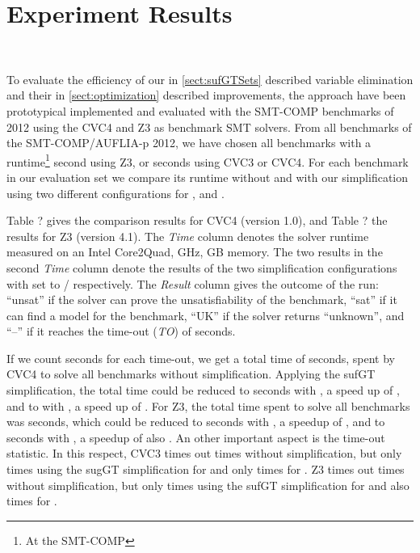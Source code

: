\section{Experiment Results}
\label{a:sect:experiments}

\\


To evaluate the efficiency of our in \ref{sect:sufGTSets} described variable elimination and their in \ref{sect:optimization} described improvements, the approach have been prototypical implemented and evaluated with the SMT-COMP benchmarks of 2012 using the CVC4 and Z3 as benchmark SMT solvers. 
From all benchmarks of the SMT-COMP/AUFLIA-p 2012, we have chosen all benchmarks with a runtime\footnote{At the SMT-COMP}  second using Z3, or  seconds using CVC3 or CVC4. 
For each benchmark in our evaluation set we compare its runtime without and with our simplification using two different configurations for ,  and  .

Table ?
gives the comparison results for CVC4 (version 1.0), and Table ?
the results for Z3 (version 4.1).
The \emph{Time} column denotes the solver runtime measured on an Intel Core2Quad, GHz, GB memory. The two results in the second \emph{Time} column denote the results of the two simplification configurations with  set to  /  respectively. The \emph{Result} column gives the outcome of the run: ``unsat'' if the solver can prove the unsatisfiability of the benchmark, ``sat'' if it can find a model for the benchmark, ``UK'' if the solver returns ``unknown'', and ``--'' if it reaches the time-out (\emph{TO}) of  seconds.

If we count  seconds for each time-out, we get a total time of  seconds, spent by CVC4 to solve all  benchmarks without simplification. Applying the sufGT simplification, the total time could be reduced to  seconds with , a speed up of , and to  with , a speed up of . For Z3, the total time spent to solve all benchmarks was  seconds, which could be reduced to  seconds with , a speedup of , and to  seconds with , a speedup of also . An other important aspect is the time-out statistic. In this respect, CVC3 times out  times without simplification, but only  times using the sugGT simplification for  and only  times for . Z3 times out  times without simplification, but only  times using the sufGT simplification for  and also  times for .




